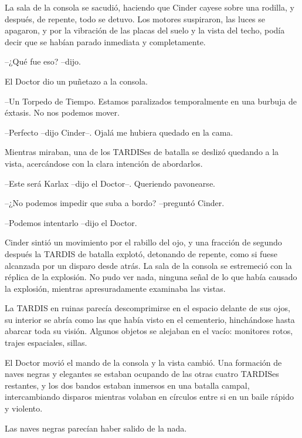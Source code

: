La sala de la consola se sacudió, haciendo que Cinder cayese sobre una rodilla, y después, de repente, todo se detuvo. Los motores suspiraron, las luces se apagaron, y por la vibración de las placas del suelo y la vista del techo, podía decir que se habían parado inmediata y completamente.



--¿Qué fue eso? --dijo.



El Doctor dio un puñetazo a la consola. 



--Un Torpedo de Tiempo. Estamos paralizados temporalmente en una burbuja de éxtasis. No nos podemos mover.

--Perfecto --dijo Cinder--. Ojalá me hubiera quedado en la cama.



Mientras miraban, una de los TARDISes de batalla se deslizó quedando a la vista, acercándose con la clara intención de abordarlos. 



--Este será Karlax --dijo el Doctor--. Queriendo pavonearse.

--¿No podemos impedir que suba a bordo? --preguntó Cinder.

--Podemos intentarlo --dijo el Doctor.



Cinder sintió un movimiento por el rabillo del ojo, y una fracción de segundo después la TARDIS de batalla explotó, detonando de repente, como si fuese alcanzada por un disparo desde atrás. La sala de la consola se estremeció con la réplica de la explosión. No pudo ver nada, ninguna señal de lo que había causado la explosión, mientras apresuradamente examinaba las vistas.

La TARDIS en ruinas parecía descomprimirse en el espacio delante de sus ojos, su interior se abría como las que había visto en el cementerio, hinchándose hasta abarcar toda su visión. Algunos objetos se alejaban en el vacío: monitores rotos, trajes espaciales, sillas.

El Doctor movió el mando de la consola y la vista cambió. Una formación de naves negras y elegantes se estaban ocupando de las otras cuatro TARDISes restantes, y los dos bandos estaban inmersos en una batalla campal, intercambiando disparos mientras volaban en círculos entre si en un baile rápido y violento.

Las naves negras parecían haber salido de la nada. 



